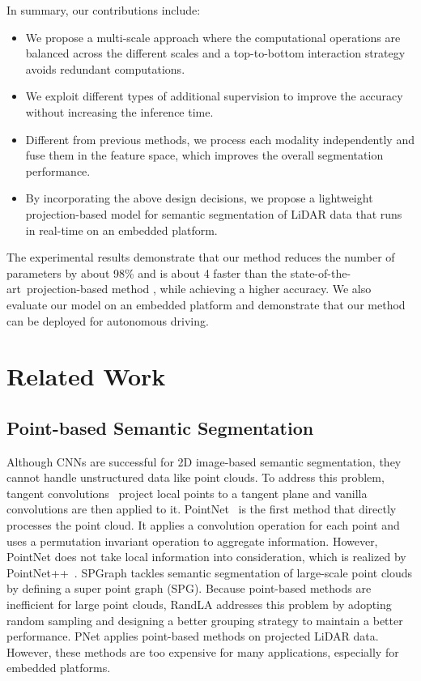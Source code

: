 \documentclass[letterpaper, 10 pt, journal, twoside]{ieeetran}
\def\sArt{{state-of-the-art~}}
\begin{document}
In summary, our contributions include:
\begin{itemize}
    \item We propose a multi-scale approach where the computational operations are balanced across the different scales and a top-to-bottom interaction strategy avoids redundant computations. 
\item We exploit different types of additional supervision to improve the accuracy without increasing the inference time.
\item Different from previous methods, we process each modality independently and fuse them in the feature space, which improves the overall segmentation performance.
\item By incorporating the above design decisions, we propose a lightweight projection-based model for semantic segmentation of LiDAR data that runs in real-time on an embedded platform.
\end{itemize}
The experimental results demonstrate that our method reduces the number of parameters by about 98\% and is about 4 faster than the \sArt projection-based method \cite{milioto2019rangenet++}, while achieving a higher accuracy.
We also evaluate our model on an embedded platform and demonstrate that our method can be deployed for autonomous driving.




\section{Related Work}

\subsection{Point-based Semantic Segmentation}
Although CNNs \cite{chen2017rethinking,zhao2017pyramid,howard2019searching,ma2018shufflenet} are successful for 2D image-based semantic segmentation, they cannot handle unstructured data like point clouds.
To address this problem, tangent convolutions~\cite{tatarchenko2018tangent} 
project local points to a tangent plane and vanilla convolutions are then applied to it.
PointNet~\cite{qi2017pointnet} is the first method that directly 
processes the point cloud.
It applies a convolution operation for each point and uses a permutation invariant operation to aggregate information.
However, PointNet does not take local information into consideration, which is realized by PointNet++~\cite{qi2017pointnet++}.
SPGraph \cite{landrieu2018large} tackles semantic segmentation of large-scale point clouds by defining a super point graph (SPG).
Because point-based methods are inefficient for large point clouds, RandLA \cite{hu2019randla} addresses this problem by adopting random sampling and designing a better grouping strategy to maintain a better performance.
PNet \cite{li2020projected} applies point-based methods on projected LiDAR data.
However, these methods are too expensive for many applications, especially for embedded platforms.
\end{document}
